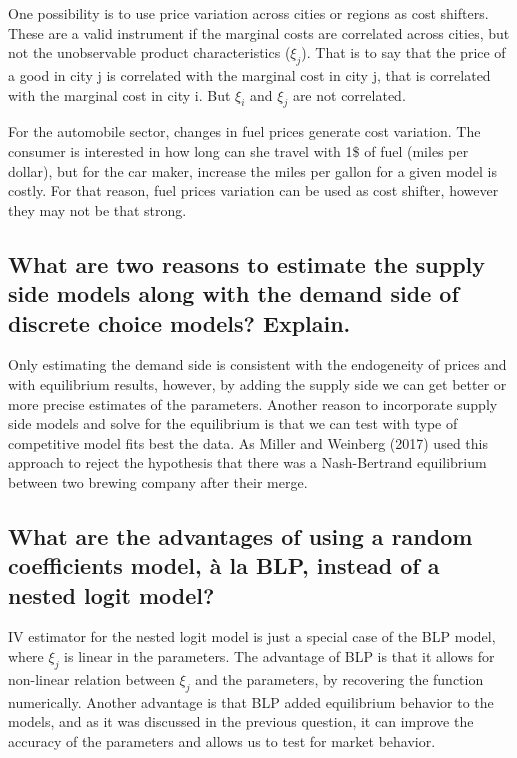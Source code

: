 \documentclass[]{article}
\begin{document}
One possibility is to use price variation across cities or regions as
cost shifters. These are a valid instrument if the marginal costs are
correlated across cities, but not the unobservable product
characteristics (\(\xi_j\)). That is to say that the price of a good in
city j is correlated with the marginal cost in city j, that is
correlated with the marginal cost in city i. But \(\xi_i\) and \(\xi_j\)
are not correlated.

For the automobile sector, changes in fuel prices generate cost
variation. The consumer is interested in how long can she travel with
1\$ of fuel (miles per dollar), but for the car maker, increase the
miles per gallon for a given model is costly. For that reason, fuel
prices variation can be used as cost shifter, however they may not be
that strong.

\hypertarget{sec:question5}{%
\subsection{What are two reasons to estimate the supply side models
along with the demand side of discrete choice models?
Explain.}\label{sec:question5}}

Only estimating the demand side is consistent with the endogeneity of
prices and with equilibrium results, however, by adding the supply side
we can get better or more precise estimates of the parameters. Another
reason to incorporate supply side models and solve for the equilibrium
is that we can test with type of competitive model fits best the data.
As Miller and Weinberg (2017) used this approach to reject the
hypothesis that there was a Nash-Bertrand equilibrium between two
brewing company after their merge.

\hypertarget{what-are-the-advantages-of-using-a-random-coefficients-model-a-la-blp-instead-of-a-nested-logit-model}{%
\subsection{What are the advantages of using a random coefficients
model, à la BLP, instead of a nested logit
model?}\label{what-are-the-advantages-of-using-a-random-coefficients-model-a-la-blp-instead-of-a-nested-logit-model}}

IV estimator for the nested logit model is just a special case of the
BLP model, where \(\xi_j\) is linear in the parameters. The advantage of
BLP is that it allows for non-linear relation between \(\xi_j\) and the
parameters, by recovering the function numerically. Another advantage is
that BLP added equilibrium behavior to the models, and as it was
discussed in the previous question, it can improve the accuracy of the
parameters and allows us to test for market behavior.
\end{document}
